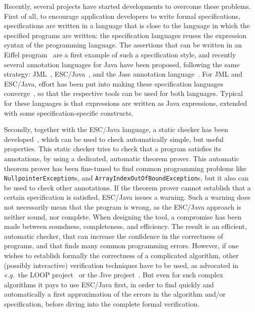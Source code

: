 \documentclass[a4paper]{llncs}
\begin{document}
Recently, several projects have started developments to overcome these
problems. First of all, to encourage application developers to write
formal specifications, specifications are written in a language that
is close to the language in which the specified programs are written:
the specification languages reuses the expression syntax of the
programming language.  The assertions that can be written in an Eiffel
program~\cite{Meyer97} are a first example of such a specification
style, and recently several annotation languages for Java have been
proposed, following the same strategy: JML~\cite{LeavensBR00},
ESC/Java~\cite{ESCJavaUrl}, and the Jass annotation
language~\cite{JassUrl}. For JML and ESC/Java, effort has been put
into making these specification languages converge~\cite{EscJmlDiff},
so that the respective tools can be used for both languages. Typical
for these languages is that expressions are written as Java
expressions, extended with some specification-specific constructs.

Secondly, together with the ESC/Java language, a static checker has
been developed~\cite{ESCJavaUrl}, which can be used to check
automatically simple, but useful properties. This static checker tries
to check that a program satisfies its annotations, by using a
dedicated, automatic theorem prover. This automatic theorem prover has
been fine-tuned to find common programming problems like
\texttt{Null\-pointer\-Exception}s, and
\texttt{Array\-Index\-Out\-Of\-Bound\-Exception}s, but it also can be
used to check other annotations. If the theorem prover cannot
establish that a certain specification is satisfied, ESC/Java issues a
warning. Such a warning does not necessarily mean that the program is
wrong, as the ESC/Java approach is neither sound, nor complete. When
designing the tool, a compromise has been made between soundness,
completeness, and efficiency. The result is an efficient, automatic
checker, that can increase the confidence in the correctness of
programs, and that finds many common programming errors. However, if
one wishes to establish formally the correctness of a complicated
algorithm, other (possibly interactive) verification techniques have
to be used, as advocated in
\emph{e.g.}~the LOOP project~\cite{LOOPUrl} or the Jive
project~\cite{MeyerP00}. But even for such complex algorithms it pays
to use ESC/Java first, in order to find quickly and automatically a
first approximation of the errors in the algorithm and/or
specification, before diving into the complete formal verification.
\end{document}
